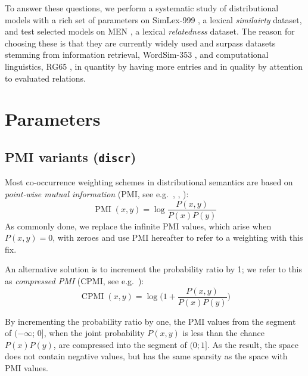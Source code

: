 \documentclass[11pt]{article}
\begin{document}
To answer these questions, we perform a systematic study of distributional models with a rich set of parameters on SimLex-999  \cite{hill2014simlex}, a lexical \emph{similairty} dataset, and test selected models on MEN \cite{Bruni:2014:MDS:2655713.2655714}, a lexical \emph{relatedness} dataset. The reason for choosing these is that they are currently widely used and surpass datasets stemming from information retrieval, WordSim-353 \cite{2002:PSC:503104.503110}, and computational linguistics, RG65 \cite{Rubenstein:1965:CCS:365628.365657}, in quantity by having more entries and in quality by attention to evaluated relations.

\section{Parameters}
\label{sec:parameters}



\subsection{PMI variants (\texttt{discr})}
\label{sec:pmi-variants}

Most co-occurrence weighting schemes in distributional semantics are based on \emph{point-wise mutual information} (PMI, see e.g.~, , ):
%
\begin{equation}
  \label{eq:pmi}
  \operatorname{PMI}(x, y) = \log\frac{P(x,y)}{P(x)P(y)}
\end{equation}
%
As commonly done, we replace the infinite PMI values,\footnotemark{} which arise when $P(x, y) = 0$, with zeroes and use PMI hereafter to refer to a weighting with this fix.


An alternative solution is to increment the probability ratio by 1; we refer to this as \textit{compressed PMI} (CPMI, see e.g.~):
%
\begin{equation}
  \label{eq:cpmi}
  \operatorname{CPMI}(x, y) = \log\Big( 1 + \frac{P(x,y)}{P(x)P(y)} \Big)
\end{equation}

By incrementing the probability ratio by one, the PMI values from the segment of $(-\infty$; 0], when the joint probability $P(x,y)$ is less than the chance $P(x)P(y)$, are compressed into the segment of $(0; 1]$.
As the result, the space does not contain negative values, but has the same sparsity as the space with PMI values.
\end{document}

